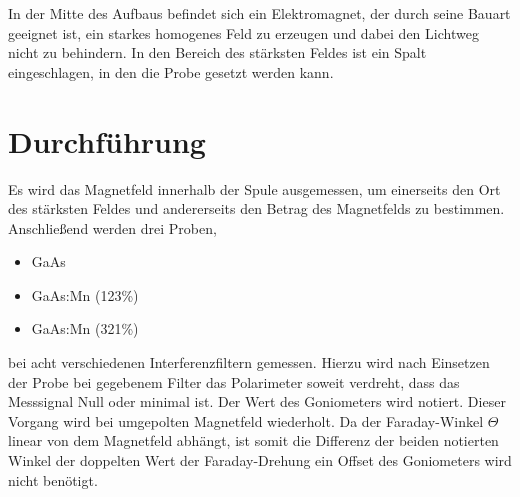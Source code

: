 In der Mitte des Aufbaus befindet sich ein Elektromagnet, der durch seine Bauart geeignet ist,
ein starkes homogenes Feld zu erzeugen und dabei den Lichtweg nicht zu behindern.
In den Bereich des stärksten Feldes ist ein Spalt eingeschlagen, in den die Probe gesetzt werden kann.

\section{Durchführung}
\label{sec:Durchfuehrung}
Es wird das Magnetfeld innerhalb der Spule ausgemessen, um einerseits den Ort des stärksten Feldes und andererseits den Betrag des Magnetfelds zu bestimmen.
Anschließend werden drei Proben,
\begin{itemize}
    \item{GaAs}
    \item{GaAs:Mn (123\%)}
    \item{GaAs:Mn (321\%)}
\end{itemize}
bei acht verschiedenen Interferenzfiltern gemessen.
Hierzu wird nach Einsetzen der Probe bei gegebenem Filter das Polarimeter soweit verdreht,
dass das Messsignal Null oder minimal ist. Der Wert des Goniometers wird notiert.
Dieser Vorgang wird bei umgepolten Magnetfeld wiederholt. Da der Faraday-Winkel $\Theta$ linear von dem Magnetfeld abhängt,
ist somit die Differenz der beiden notierten Winkel der doppelten Wert der Faraday-Drehung ein Offset des Goniometers wird nicht benötigt.
